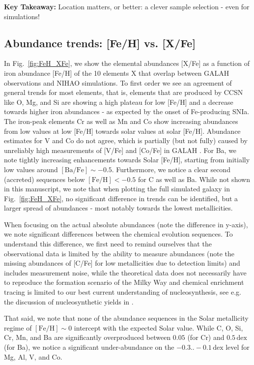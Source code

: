 \documentclass[fleqn,usenatbib]{mnras}
\begin{document}
\textbf{Key Takeaway:} Location matters, or better: a clever sample selection - even for simulations!

\subsection{Abundance trends: [Fe/H] vs. [X/Fe]} \label{sec:feh_xfe}

In Fig.~\ref{fig:FeH_XFe}, we show the elemental abundances [X/Fe] as a function of iron abundance [Fe/H] of the 10 elements X that overlap between GALAH observations and NIHAO simulations. To first order we see an agreement of general trends for most elements, that is, elements that are produced by CCSN like O, Mg, and Si are showing a high plateau for low [Fe/H] and a decrease towards higher iron abundances - as expected by the onset of Fe-producing SNIa. The iron-peak elements Cr as well as Mn and Co show increasing abundances from low values at low [Fe/H] towards solar values at solar [Fe/H]. Abundance estimates for V and Co do not agree, which is partially (but not fully) caused by unreliably high measurements of [V/Fe] and [Co/Fe] in GALAH \citet{Buder2021}. For Ba, we note tightly increasing enhancements towards Solar [Fe/H], starting from initially low values around $\mathrm{[Ba/Fe]} \sim -0.5$. Furthermore, we notice a clear second (accreted) sequences below $\mathrm{[Fe/H]} < -0.5$ for C as well as Ba. While not shown in this manuscript, we note that when plotting the full simulated galaxy in Fig.~\ref{fig:FeH_XFe}, no significant difference in trends can be identified, but a larger spread of abundances - most notably towards the lowest metallicities.

When focusing on the actual absolute abundances (note the difference in y-axis), we note significant differences between the chemical evolution sequences. To understand this difference, we first need to remind ourselves that the observational data is limited by the ability to measure abundances (note the missing abundances of [C/Fe] for low metallicities due to detection limits) and includes measurement noise, while the theoretical data does not necessarily have to reproduce the formation scenario of the Milky Way and chemical enrichment tracing is limited to our best current understanding of nucleosynthesis, see e.g. the discussion of nucleosynthetic yields in \citet{Buck2021}.

That said, we note that none of the abundance sequences in the Solar metallicity regime of $\mathrm{[Fe/H]} \sim 0$ intercept with the expected Solar value. While C, O, Si, Cr, Mn, and Ba are significantly overproduced between $0.05$ (for Cr) and $0.5\,\mathrm{dex}$ (for Ba), we notice a significant under-abundance on the $-0.3..-0.1\,\mathrm{dex}$ level for Mg, Al, V, and Co.
\end{document}
